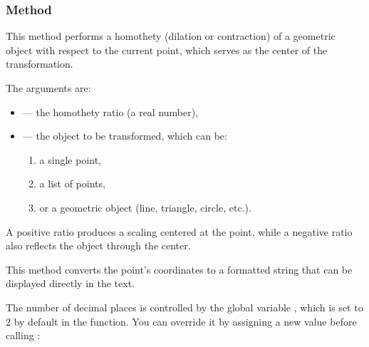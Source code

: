 \subsubsection{Method } %
\label{ssub:method_point_homothety_k_obj}

This method performs a homothety (dilation or contraction) of a geometric object with respect to the current point, which serves as the center of the transformation.

\medskip
\noindent
The arguments are:
\begin{itemize}
  \item {} — the homothety ratio (a real number),
  \item {} — the object to be transformed, which can be:
  \begin{enumerate}
    \item a single point,
    \item a list of points,
    \item or a geometric object (line, triangle, circle, etc.).
  \end{enumerate}
\end{itemize}

\noindent
A positive ratio  produces a scaling centered at the point, while a negative ratio also reflects the object through the center.

\vspace{1em}

\begin{tkzexample}[latex=7cm]
\begin{center}
\end{center}
\end{tkzexample}

 This method converts the point’s coordinates to a formatted string that can be displayed directly in the text.

\medskip
\noindent
The number of decimal places is controlled by the global variable , which is set to $2$ by default in the  function. You can override it by assigning a new value before calling :


